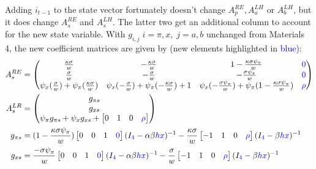 \documentclass[11pt]{article}
\renewcommand{\[}{\begin{equation}}
\renewcommand{\]}{\end{equation}}
\begin{document}
Adding $i_{t-1}$ to the state vector fortunately doesn't change $A^{RE}_p, A^{LH}_a$ or $A^{LH}_b$, but it does change $A^{RE}_s$ and $A^{LH}_s$. The latter two get an additional column to account for the new state variable. With $g_{i, j} \; i=\pi,x, \; j=a,b$ unchanged from Materials 4, the new coefficient matrices are given by (new elements highlighted in \textcolor{blue}{blue}):
\begin{align}
A_s^{RE} &= \begin{pmatrix}   \frac{\kappa\sigma}{w}  &-\frac{\kappa\sigma}{w}  & 1-\frac{\kappa\sigma\psi_{\pi}}{w} & \textcolor{blue}{0}\\
 \frac{ \sigma}{w} &  -\frac{\sigma}{w} & -\frac{\sigma\psi_{\pi}}{w} & \textcolor{blue}{0}\\ 
 \psi_x( \frac{\sigma}{w}) + \psi_{\pi}( \frac{\kappa\sigma}{w}) & \psi_x(- \frac{\sigma}{w}) + \psi_{\pi}(- \frac{\kappa\sigma}{w}) +1 &  \psi_x(-\frac{\sigma\psi_{\pi}}{w}) + \psi_{\pi}( 1-\frac{\kappa\sigma\psi_{\pi}}{w}) & \textcolor{blue}{\rho}\end{pmatrix}  
\\
 A_s^{LR} & = \begin{pmatrix} g_{\pi s} \\ g_{x s} \\ \psi_{\pi}g_{\pi s} + \psi_xg_{x s} + \begin{bmatrix} 0 & 1& 0 & \textcolor{blue}{\rho}\end{bmatrix}
\end{pmatrix} \\
g_{\pi s} & = (1-\frac{\kappa\sigma\psi_{\pi}}{w} )\begin{bmatrix} 0&0&1 & \textcolor{blue}{0}\end{bmatrix} (I_{\textcolor{blue}{4}} - \alpha\beta \textcolor{blue}{hx})^{-1} -\frac{\kappa\sigma}{w}\begin{bmatrix} -1&1&0 & \textcolor{blue}{\rho} \end{bmatrix} (I_{\textcolor{blue}{4}} -\beta \textcolor{blue}{hx})^{-1}\\
g_{x s} & =  \frac{-\sigma\psi_{\pi}}{w} \begin{bmatrix} 0&0&1& \textcolor{blue}{0} \end{bmatrix}(I_{\textcolor{blue}{4}} - \alpha\beta \textcolor{blue}{hx})^{-1}  -\frac{\sigma}{w}\begin{bmatrix} -1&1&0 & \textcolor{blue}{\rho}\end{bmatrix}(I_{\textcolor{blue}{4}} -\beta \textcolor{blue}{hx})^{-1}
\end{align}
\end{document}
